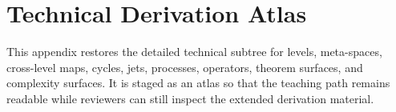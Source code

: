 \section{Technical Derivation Atlas}
This appendix restores the detailed technical subtree for levels, meta-spaces, cross-level maps, cycles, jets, processes, operators, theorem surfaces, and complexity surfaces. It is staged as an atlas so that the teaching path remains readable while reviewers can still inspect the extended derivation material.
\begingroup
\let\ocappendixsection\section
\let\ocappendixsubsection\subsection
\let\ocappendixsubsubsection\subsubsection
\renewcommand{\section}{\ocappendixsubsection}
\renewcommand{\subsection}{\ocappendixsubsubsection}

\endgroup
